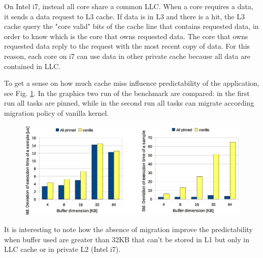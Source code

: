 On Intel i7, instead all core share a common LLC. When a core requires a data, it sends a data request to L3 cache. If data is in L3 and there is a hit, 
the L3 cache query the "core valid" bits of the cache line that contains requested data, in order to know which is the core that owns requested data. The 
core that owns requested data reply to the request with the most recent copy of data. For this reason, each core on i7 can use data in other private cache
because all data are contained in LLC.

To get a sense on how much cache miss influence predictability of the application, see Fig. \ref{fig:time_cpf_var_Xeon_i7}. In the graphics two run of the
benchmark are compared: in the first run all tasks are pinned, while in the second run all tasks can migrate according migration policy of vanilla kernel.

\begin{figure}[htbp]
\centering
\includegraphics[width=\widefigure]{images/cpf_time/time_cpf_var_Xeon_i7.eps}
\caption{}
\label{fig:time_cpf_var_Xeon_i7}
\end{figure}

It is interesting to note how the absence of migration improve the predictability when buffer used are greater than 32KB that can't be stored in L1 but 
only in LLC cache or in private L2 (Intel i7).

